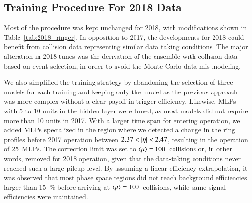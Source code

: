 
\FloatBarrier
\subsection{Training Procedure For 2018 Data}\label{ssec:2018}

Most of the procedure was kept unchanged for 2018, with modifications shown in
Table~\ref{tab:2018_ringer}.
In opposition to 2017, the developments for 2018
could benefit from collision data 
representing similar data taking conditions.
The major alteration in 2018 tunes was the derivation of the \rnn{} ensemble with collision data based on \Zee{} \tnp{} event selection, in order to avoid the Monte Carlo data mis-modeling.

We also simplified the training strategy by abandoning the selection of three
models for each training and keeping only the \spmax{} model as the previous approach was more complex without a clear
payoff in trigger efficiency.
Likewise, MLPs with 5 to 10 units in the hidden layer were tuned, as most models did not require
more than 10 units in 2017. With a larger time span for entering operation, we
added MLPs specialized in the region where we detected a change in the ring
profiles before 2017 operation between $2.37<\abseta<2.47$, resulting in the operation of
\SI{25}{MLPs}. The correction limit was set to
$\langle \mu \rangle{}=100$~collisions or, in other words, removed for 2018 operation, given
that the data-taking 
conditions never reached such a large pileup level. By
assuming a linear efficiency extrapolation,%
it was observed that most phase space regions did not reach background efficiencies
larger than \SI{15}{\%} before arriving at $\langle \mu \rangle=100$~collisions, while same
signal efficiencies were maintained.






